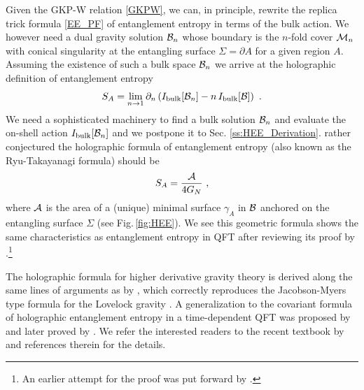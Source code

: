 Given the GKP-W relation \eqref{GKPW}, we can, in principle, rewrite the replica trick formula \eqref{EE_PF} of entanglement entropy in terms of the bulk action.
We however need a dual gravity solution ${\cal B}_n$ whose boundary is the $n$-fold cover ${\cal M}_n$ with conical singularity at the entangling surface $\Sigma = \partial A$ for a given region $A$.
Assuming the existence of such a bulk space ${\cal B}_n$ we arrive at the holographic definition of entanglement entropy
\begin{align}\label{HEE_Replica}
	S_A = \lim_{n\to 1} \partial_n \left( I_\text{bulk} [{\cal B}_n] - n\, I_\text{bulk} [{\cal B}]\right) \ .
\end{align}
We need a sophisticated machinery to find a bulk solution ${\cal B}_n$ and evaluate the on-shell action $I_\text{bulk}[{\cal B}_n]$ and we postpone it to Sec. \ref{ss:HEE_Derivation}.
\textcite{Ryu:2006bv} rather conjectured the holographic formula of entanglement entropy (also known as the Ryu-Takayanagi formula) should be 
\begin{align}\label{ARE}
S_A = \frac{{\cal A}}{4G_N}\ ,
\end{align}
where ${\cal A}$ is the area of a (unique) minimal surface $\gamma_A$ in ${\cal B}$ anchored on the entangling surface $\Sigma$ (see Fig.\,\ref{fig:HEE}).
We see this geometric formula shows the same characteristics as entanglement entropy in QFT after reviewing its proof by \textcite{Lewkowycz:2013nqa}.\footnote{An earlier attempt for the proof was put forward by \textcite{Fursaev:2006ih}.}


The holographic formula for higher derivative gravity theory is derived along the same lines of arguments as \textcite{Lewkowycz:2013nqa} by \textcite{Dong:2013qoa,Camps:2013zua,Miao:2014nxa}, which correctly reproduces the Jacobson-Myers type formula \cite{Jacobson:1993xs} for the Lovelock gravity \cite{deBoer:2011wk,Hung:2011xb}.
A generalization to the covariant formula of holographic entanglement entropy in a time-dependent QFT was proposed by \textcite{Hubeny:2007xt} and later proved by \textcite{Dong:2016hjy}.
We refer the interested readers to the recent textbook by \textcite{Rangamani:2016dms} and references therein for the details.


